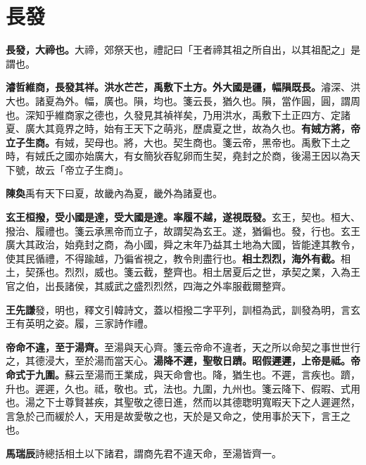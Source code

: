 \section{長發}


\textbf{長發，大禘也。}{\footnotesize 大禘，郊祭天也，禮記曰「王者禘其祖之所自出，以其祖配之」是謂也。}

\textbf{濬哲維商，長發其祥。洪水芒芒，禹敷下土方。外大國是疆，幅隕既長。}{\footnotesize 濬深、洪大也。諸夏為外。幅，廣也。隕，均也。箋云長，猶久也。隕，當作圓，圓，謂周也。深知乎維商家之德也，久發見其禎祥矣，乃用洪水，禹敷下土正四方、定諸夏、廣大其竟界之時，始有王天下之萌兆，歷虞夏之世，故為久也。}\textbf{有娀方將，帝立子生商。}{\footnotesize 有娀，契母也。將，大也。契生商也。箋云帝，黑帝也。禹敷下土之時，有娀氏之國亦始廣大，有女簡狄吞鳦卵而生契，堯封之於商，後湯王因以為天下號，故云「帝立子生商」。}

\begin{quoting}\textbf{陳奐}禹有天下曰夏，故畿內為夏，畿外為諸夏也。\end{quoting}

\textbf{玄王桓撥，受小國是達，受大國是達。率履不越，遂視既發。}{\footnotesize 玄王，契也。桓大、撥治、履禮也。箋云承黑帝而立子，故謂契為玄王。遂，猶徧也。發，行也。玄王廣大其政治，始堯封之商，為小國，舜之末年乃益其土地為大國，皆能達其教令，使其民循禮，不得踰越，乃徧省視之，教令則盡行也。}\textbf{相土烈烈，海外有截。}{\footnotesize 相土，契孫也。烈烈，威也。箋云截，整齊也。相土居夏后之世，承契之業，入為王官之伯，出長諸侯，其威武之盛烈烈然，四海之外率服截爾整齊。}

\begin{quoting}\textbf{王先謙}發，明也，釋文引韓詩文，蓋以桓撥二字平列，訓桓為武，訓發為明，言玄王有英明之姿。履，三家詩作禮。\end{quoting}

\textbf{帝命不違，至于湯齊。}{\footnotesize 至湯與天心齊。箋云帝命不違者，天之所以命契之事世世行之，其德浸大，至於湯而當天心。}\textbf{湯降不遲，聖敬日躋。昭假遲遲，上帝是祗。帝命式于九圍。}{\footnotesize 蘇云至湯而王業成，與天命會也。降，猶生也。不遲，言疾也。躋，升也。遲遲，久也。祗，敬也。式，法也。九圍，九州也。箋云降下、假暇、式用也。湯之下士尊賢甚疾，其聖敬之德日進，然而以其德聦明寬暇天下之人遲遲然，言急於己而緩於人，天用是故愛敬之也，天於是又命之，使用事於天下，言王之也。}

\begin{quoting}\textbf{馬瑞辰}詩總括相土以下諸君，謂商先君不違天命，至湯皆齊一。\end{quoting}

